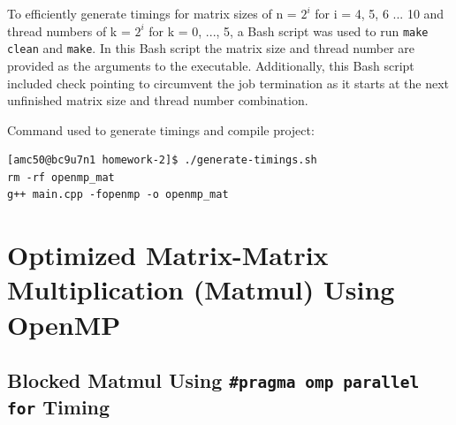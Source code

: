 \documentclass{article}
\begin{document}
\bigskip
\noindent 
To efficiently generate timings for matrix sizes of n = $2^{i}$ for i = 4, 5, 6 ... 10 and thread numbers of  k = $2^{i}$ for k = 0, ..., 5, a Bash script was used to run \texttt{make clean} and \texttt{make}. In this Bash script the matrix size and thread number are provided as the arguments to the executable. Additionally, this Bash script included check pointing to circumvent the job termination as it starts at the next unfinished matrix size and thread number combination.

\bigskip
\noindent 
Command used to generate timings and compile project:
\begin{verbatim}
[amc50@bc9u7n1 homework-2]$ ./generate-timings.sh 
rm -rf openmp_mat
g++ main.cpp -fopenmp -o openmp_mat
\end{verbatim}

\clearpage
\section{Optimized Matrix-Matrix Multiplication (Matmul) Using OpenMP}

\subsection{Blocked Matmul Using \texttt{\#pragma omp parallel for} Timing}

\begin{table}[ht!]
    \caption{Parallel Blocked Matrix-Matrix Multiplication Timings (Seconds) on NOTS}
    \centering
\end{table}
\end{document}

